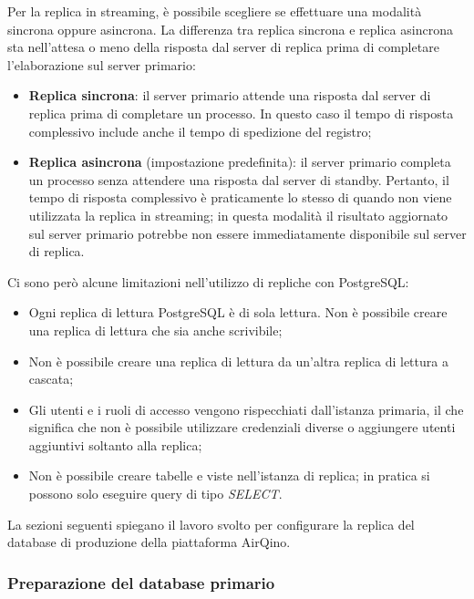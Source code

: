 Per la replica in streaming, è possibile scegliere se effettuare una modalità sincrona oppure asincrona. La differenza tra replica sincrona e replica asincrona sta nell'attesa o meno della risposta dal server di replica prima di completare l'elaborazione sul server primario:
\begin{itemize}
  \item \textbf{Replica sincrona}: il server primario attende una risposta dal server di replica prima di completare un processo. In questo caso il tempo di risposta complessivo include anche il tempo di spedizione del registro;
  \item \textbf{Replica asincrona} (impostazione predefinita): il server primario completa un processo senza attendere una risposta dal server di standby. Pertanto, il tempo di risposta complessivo è praticamente lo stesso di quando non viene utilizzata la replica in streaming; in questa modalità il risultato aggiornato sul server primario potrebbe non essere immediatamente disponibile sul server di replica. \cite{streaming_replication}
\end{itemize}

Ci sono però alcune limitazioni nell'utilizzo di repliche con PostgreSQL:
\begin{itemize}
  \item Ogni replica di lettura PostgreSQL è di sola lettura. Non è possibile creare una replica di lettura che sia anche scrivibile;
  \item Non è possibile creare una replica di lettura da un'altra replica di lettura a cascata;
  \item Gli utenti e i ruoli di accesso vengono rispecchiati dall'istanza primaria, il che significa che non è possibile utilizzare credenziali diverse o aggiungere utenti aggiuntivi soltanto alla replica;
  \item Non è possibile creare tabelle e viste nell'istanza di replica; in pratica si possono solo eseguire query di tipo \textit{SELECT}.
\end{itemize}

La sezioni seguenti spiegano il lavoro svolto per configurare la replica del database di produzione della piattaforma AirQino.

\subsubsection{Preparazione del database primario}

